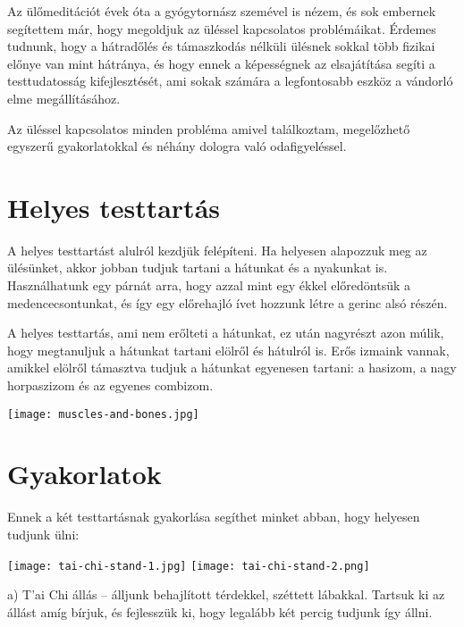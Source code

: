 \documentclass[12pt,oneside,landscape,final]{memoir}
\begin{document}
\vfill\mbox{}

\clearpage

Az ülőmeditációt évek óta a gyógytornász szemével is nézem, és sok embernek
segítettem már, hogy megoldjuk az üléssel kapcsolatos problémáikat. Érdemes
tudnunk, hogy a hátradőlés és támaszkodás nélküli ülésnek sokkal több fizikai
előnye van mint hátránya, és hogy ennek a képességnek az elsajátítása segíti a
testtudatosság kifejlesztését, ami sokak számára a legfontosabb eszköz a
vándorló elme megállításához.

Az üléssel kapcsolatos minden probléma amivel találkoztam, megelőzhető egyszerű
gyakorlatokkal és néhány dologra való odafigyeléssel.

\section{Helyes testtartás}

A helyes testtartást alulról kezdjük felépíteni. Ha helyesen alapozzuk meg az
ülésünket, akkor jobban tudjuk tartani a hátunkat és a nyakunkat is.
Használhatunk egy párnát arra, hogy azzal mint egy ékkel előredöntsük a
medencecsontunkat, és így egy előrehajló ívet hozzunk létre a gerinc alsó
részén.

A helyes testtartás, ami nem erőlteti a hátunkat, ez után nagyrészt azon múlik,
hogy megtanuljuk a hátunkat tartani elölről és hátulról is. Erős izmaink vannak,
amikkel elölről támasztva tudjuk a hátunkat egyenesen tartani: a hasizom, a nagy
horpaszizom és az egyenes combizom.

{\centering\par
\texttt{[image: muscles-and-bones.jpg]}
\par}

\clearpage

\section{Gyakorlatok}

Ennek a két testtartásnak gyakorlása segíthet minket abban, hogy helyesen
tudjunk ülni:

{\centering\par
\texttt{[image: tai-chi-stand-1.jpg]}%
\hspace*{5mm}%
\texttt{[image: tai-chi-stand-2.png]}
\par}

a) T’ai Chi állás – álljunk behajlított térdekkel, széttett lábakkal. Tartsuk ki
az állást amíg bírjuk, és fejlesszük ki, hogy legalább két percig tudjunk így
állni.
\end{document}

